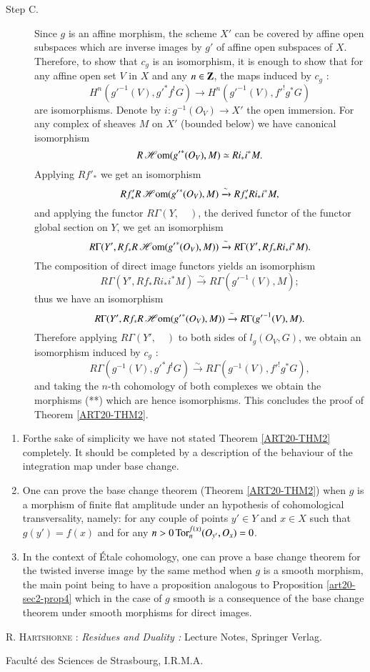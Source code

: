 \begin{description}
\item[Step C.] Since $g$ is an affine morphism, the scheme $X'$ can be covered by affine open subspaces which are inverse images by $g'$ of affine open subspaces of $X$. Therefore, to show that $c_{g}$ is an isomorphism, it is enough to show that for any affine open set $V$ in $X$ and any $n\in \mathbf{Z}$, the maps induced by $c_{g}$ :
\begin{equation*}
H^{n}({g'}^{-1}(V),{g'}^{*}f^{!}G)\to H^{n}({g'}^{-1}(V),{f'}^{!}g^{*}G)\tag{**}
\end{equation*}
are isomorphisms. Denote by $i:g^{-1}(O_{V})\to X'$ the open immersion. For any complex of sheaves $M$ on $X'$ (bounded below) we have canonical isomorphism
$$
R\operatorname{\mathscr{H}\mathrm{om}}({g'}^{*}(O_{V}), M)\simeq Ri_{*}i^{*}M.
$$
Applying $Rf'_{*}$ we get an isomorphism
$$
Rf'_{*}R\operatorname{\mathscr{H}\mathrm{om}}({g'}^{*}(O_{V}),M)\xrightarrow{\sim} Rf'_{*}Ri_{*}i^{*}M,
$$
and applying the functor $R\Gamma(Y,\quad)$, the derived functor of the functor global section on $Y$, we get an isomorphism
$$
R\Gamma(Y',Rf_{*}R\operatorname{\mathscr{H}\mathrm{om}}({g'}^{*}(O_{V}),M))\xrightarrow{\sim}R\Gamma(Y',Rf_{*}Ri_{*}i^{*}M).
$$
The composition of direct image functors yields an isomorphism
$$
R\Gamma(Y',Rf_{*}Ri_{*}i^{*}M)\xrightarrow{\sim}R\Gamma({g'}^{-1}(V),M);
$$
thus we have an isomorphism
$$
R\Gamma(Y',Rf_{*}R\operatorname{\mathscr{H}\mathrm{om}}({g'}^{*}(O_{V}),M))\xrightarrow{\sim}R\Gamma({g'}^{-1}(V),M).
$$
Therefore applying $R\Gamma(Y',\quad)$ to both sides of $l_{g}(O_{V},G)$, we obtain an isomorphism induced by $c_{g}$ :
$$
R\Gamma(g^{-1}(V),{g'}^{*}f^{!}G)\xrightarrow{\sim}R\Gamma(g^{-1}(V),{f'}^{!}g^{*}G),
$$
and taking the $n$-th cohomology of both complexes we obtain the morphisms (**) which are hence isomorphisms. This concludes the proof of Theorem \ref{ART20-THM2}.
\end{description}

\begin{remarks*}
\begin{enumerate}
\renewcommand{\labelenumi}{(\theenumi)}
\item For\pageoriginale the sake of simplicity we have not stated Theorem \ref{ART20-THM2} completely. It should be completed by a description of the behaviour of the integration map under base change.

\item One can prove the base change theorem (Theorem \ref{ART20-THM2}) when $g$ is a morphism of finite flat amplitude under an hypothesis of cohomological transversality, namely: for any couple of points $y'\in Y$ and $x\in X$ such that $g(y')=f(x)$ and for any $n>0\operatorname{\mathrm{Tor}}^{f(x)}_{n}(O_{y'},O_{x})=0$.

\item In the context of \'Etale cohomology, one can prove a base change theorem for the twisted inverse image by the same method when $g$ is a smooth morphism, the main point being to have a proposition analogous to Proposition \ref{art20-sec2-prop4} which in the case of $g$ smooth is a consequence of the base change theorem under smooth morphisms for direct images.
\end{enumerate}
\end{remarks*}

\begin{thebibliography}{99}
 \textsc{R. Hartshorne :} {\em Residues and Duality :} Lecture Notes, Springer Verlag. 
\end{thebibliography}

\bigskip
\noindent
{\small Facult\'e des Sciences de Strasbourg, I.R.M.A.}
